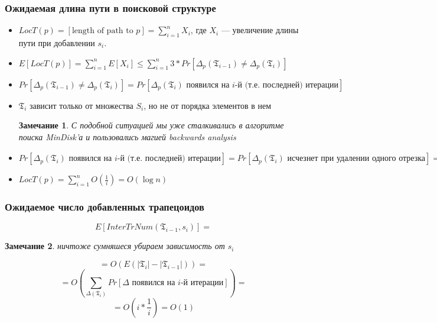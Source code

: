 \documentclass{beamer}
\newtheorem*{remark}{Замечание}
\begin{document}
\begin{frame}
    \frametitle{Ожидаемая длина пути в поисковой структуре}

    \begin{itemize}
    
    \pause
    \item $LocT(p) = [\text{length of path to }p] = \sum_{i=1}^n X_i$, где $X_i$ --- увеличение длины пути при добавлении $s_i$.
    
    \pause
    \item $E[LocT(p)] = \sum_{i=1}^n E[X_i] \le \sum_{i=1}^n 3 * Pr[\Delta_p(\mathfrak{T}_{i-1}) \neq \Delta_p(\mathfrak{T}_{i})]$ 

    \pause
    \item $Pr[\Delta_p(\mathfrak{T}_{i-1}) \neq \Delta_p(\mathfrak{T}_{i})] = Pr[\Delta_p(\mathfrak{T}_{i}) \text{ появился на } i \text{-й (т.е. последней) итерации}]$

    \pause
    \item $\mathfrak{T}_{i}$ зависит только от множества $S_i$, но не от порядка элементов в нем  
    
    \pause     
    \begin{remark}
        С подобной ситуацией мы уже сталкивались в алгоритме поиска MinDisk'а и пользовались магией backwards analysis 
    \end{remark}

    \pause
    \item $Pr[\Delta_p(\mathfrak{T}_{i}) \text{ появился на } i \text{-й (т.е. последней) итерации}] 
            = Pr[\Delta_p(\mathfrak{T}_{i}) \text{ исчезнет при удалении одного отрезка}] 
            = \frac{\text{число отрезков ``держащих'' } \Delta_p(\mathfrak{T}_{i})}{i} = O(\frac{1}{i})$

    \pause
    \item $LocT(p) = \sum_{i=1}^n O(\frac{1}{i}) = O(\log n)$

    \end{itemize}
\end{frame}

\begin{frame}
    \frametitle{Ожидаемое число добавленных трапецоидов}

    $$E[InterTrNum(\mathfrak{T}_{i-1}, s_i)] =$$
    \pause     
    \begin{remark}
        ничтоже сумняшеся убираем зависимость от $s_i$
    \end{remark}
        $$= O(E(|\mathfrak{T}_{i}| - |\mathfrak{T}_{i - 1}|)) = $$
    \pause
        $$= O(\sum_{\Delta(\mathfrak{T}_i)} Pr[\Delta \text{ появился на } i \text{-й итерации}]) = $$
    \pause
        $$= O(i * \frac{1}{i}) = O(1)$$
\end{frame}
\end{document}
